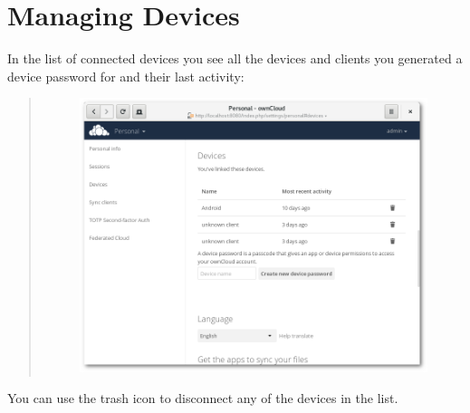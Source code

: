 \documentclass[letterpaper,10pt,english]{sphinxmanual}
\begin{document}
\section{Managing Devices}
\label{session_management:managing-devices}
In the list of connected devices you see all the devices and clients you
generated a device password for and their last activity:
\begin{quote}
\begin{figure}[htbp]
\centering

\includegraphics{settings_devices.png}
\end{figure}
\end{quote}

You can use the trash icon to disconnect any of the devices in the list.
\end{document}

